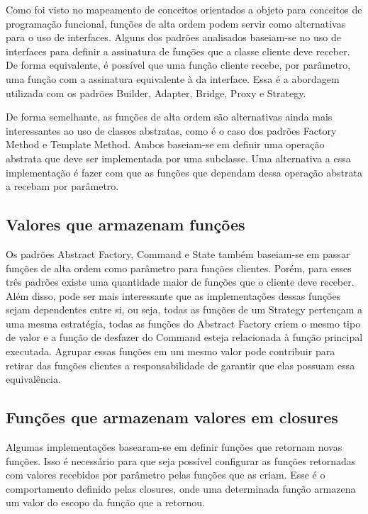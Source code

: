 Como foi visto no mapeamento de conceitos orientados 
a objeto para conceitos de programação funcional, 
funções de alta ordem podem servir como alternativas 
para o uso de interfaces. Alguns dos padrões analisados 
baseiam-se no uso de interfaces para definir a assinatura 
de funções que a classe cliente deve receber. De forma 
equivalente, é possível que uma função cliente recebe, 
por parâmetro, uma função com a assinatura equivalente 
à da interface. Essa é a abordagem utilizada com os 
padrões Builder, Adapter, Bridge, Proxy e Strategy. 

De forma semelhante, as funções de alta ordem são 
alternativas ainda mais interessantes ao uso de 
classes abstratas, como é o caso dos padrões 
Factory Method e Template Method. Ambos baseiam-se 
em definir uma operação abstrata que deve ser 
implementada por uma subclasse. Uma alternativa 
a essa implementação é fazer com que as funções 
que dependam dessa operação abstrata a recebam 
por parâmetro.

\subsection{Valores que armazenam funções}

Os padrões Abstract Factory, Command e 
State também baseiam-se em passar funções de 
alta ordem como parâmetro para funções clientes. 
Porém, para esses três padrões existe uma quantidade 
maior de funções que o cliente deve receber. Além 
disso, pode ser mais interessante que as implementações 
dessas funções sejam dependentes entre si, ou seja, 
todas as funções de um Strategy pertençam a uma mesma 
estratégia, todas as funções do Abstract Factory criem 
o mesmo tipo de valor e a função de desfazer do 
Command esteja relacionada à função principal executada. 
Agrupar essas funções em um mesmo valor pode 
contribuir para retirar das funções clientes a 
responsabilidade de garantir que elas possuam 
essa equivalência.

\subsection{Funções que armazenam valores em closures}

Algumas implementações basearam-se em definir funções 
que retornam novas funções. Isso é necessário para 
que seja possível configurar as funções retornadas 
com valores recebidos por parâmetro pelas funções 
que as criam. Esse é o comportamento definido pelas 
closures, onde uma determinada função armazena 
um valor do escopo da função que a retornou. 

